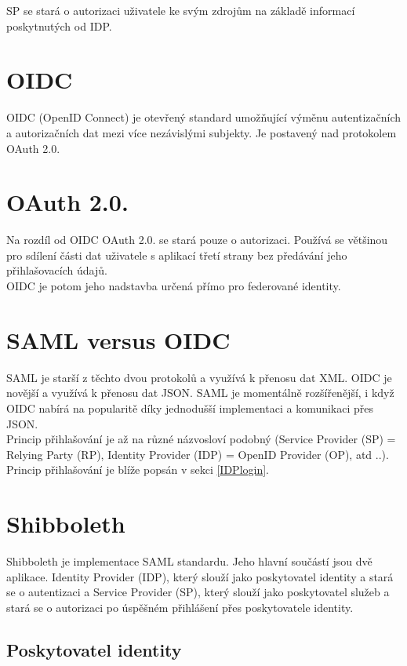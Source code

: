 SP se stará o autorizaci uživatele ke svým zdrojům na základě informací poskytnutých od IDP.

\section{OIDC}

OIDC (OpenID Connect) je otevřený standard umožňující výměnu autentizačních a autorizačních dat mezi více nezávislými subjekty. Je postavený nad protokolem OAuth 2.0.\cite{OIDC}

\section{OAuth 2.0.}
Na rozdíl od OIDC OAuth 2.0. se stará pouze o autorizaci. Používá se většinou pro sdílení části dat uživatele s aplikací třetí strany bez předávání jeho přihlašovacích údajů. \\
OIDC je potom jeho nadstavba určená přímo pro federované identity. \cite{OAUTHvSAMLvOIDC}

\section{SAML versus OIDC}

SAML je starší z těchto dvou protokolů a využívá k přenosu dat XML. OIDC je novější a využívá k přenosu dat JSON. 
SAML je momentálně rozšířenější, i když OIDC nabírá na popularitě díky jednodušší implementaci a komunikaci přes JSON.\cite{SAMLxOIDC} \\
Princip přihlašování je až na různé názvosloví podobný (Service Provider (SP) = Relying Party (RP),  Identity Provider (IDP) = OpenID Provider (OP), atd ..).
Princip přihlašování je blíže popsán v sekci \ref{IDPlogin}.

\section{Shibboleth}

Shibboleth je implementace SAML standardu. Jeho hlavní součástí jsou dvě aplikace. Identity Provider (IDP), který slouží jako poskytovatel identity a stará se o autentizaci a Service Provider (SP), který slouží jako poskytovatel služeb a stará se o autorizaci po úspěšném přihlášení přes poskytovatele identity. \cite{shibbolethWiki}

\subsection{Poskytovatel identity}

